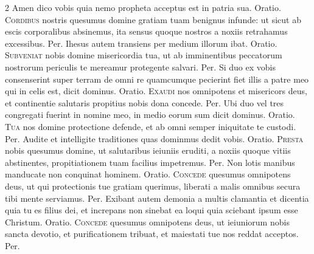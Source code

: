 \begin{multicols*}{2}
 Amen dico vobis quia nemo propheta acceptus est in patria sua. {\color{Red} Oratio.}
\lettrine[lines=2]{\zallmancaps \color{Blue} C}{ordibus} nostris quesumus domine gratiam tuam benignus infunde: ut sicut ab escis corporalibus absinemus, ita sensus quoque nostros a noxiis retrahamus excessibus. Per.%
 Ihesus autem transiens per medium illorum ibat. {\color{Red} Oratio.}
\lettrine[lines=2]{\zallmancaps \color{Red} S}{ubveniat} nobis domine misericordia tua, ut ab imminentibus peccatorum nostrorum periculis te mereamur protegente salvari. Per.%
 Si duo ex vobis consenserint super terram de omni re quamcumque pecierint fiet illis a patre meo qui in celis est, dicit dominus. {\color{Red} Oratio.}
\lettrine[lines=2]{\zallmancaps \color{Blue} E}{xaudi} nos omnipotens et misericors deus, et continentie salutaris propitius nobis dona concede. Per.
 Ubi duo vel tres congregati fuerint in nomine meo, in medio eorum sum dicit dominus. {\color{Red} Oratio.}
\lettrine[lines=2]{\zallmancaps \color{Red} T}{ua} nos domine protectione defende, et ab omni semper iniquitate te custodi. Per.
 Audite et intelligite traditiones quas dominmus dedit vobis. {\color{Red} Oratio.}
\lettrine[lines=2]{\zallmancaps \color{Blue} P}{resta} nobis quesumus domine, ut salutaribus ieiuniis eruditi, a noxiis quoque vitiis abstinentes, propitiationem tuam facilius impetremus. Per.
 Non lotis manibus manducate non conquinat hominem. {\color{Red} Oratio.}
\lettrine[lines=2]{\zallmancaps \color{Red} C}{oncede} quesumus omnipotens deus, ut qui protectionis tue gratiam querimus, liberati a malis omnibus secura tibi mente serviamus. Per.
 Exibant autem demonia a multis clamantia et dicentia quia tu es filius dei, et increpans non sinebat ea loqui quia sciebant ipsum esse Christum. {\color{Red} Oratio.}
\lettrine[lines=2]{\zallmancaps \color{Blue} C}{oncede} quesumus omnipotens deus, ut ieiuniorum nobis sancta devotio, et purificationem tribuat, et maiestati tue nos reddat acceptos. Per.

\end{multicols*}
